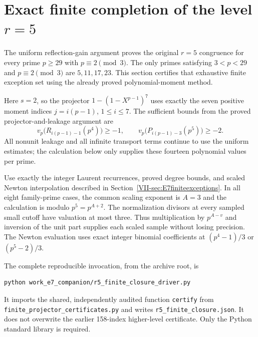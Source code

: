 \documentclass[11pt,letterpaper]{article}
\numberwithin{equation}{section}
\begin{document}
\section{Exact finite completion of the level \texorpdfstring{$r=5$}{r=5}}\label{loc-VII-13}
\label{VII-sec:E7r5finite}
The uniform reflection-gain argument proves the original $r=5$
congruence for every prime $p\ge29$ with $p\equiv2\pmod3$.
The only primes satisfying $3<p<29$ and $p\equiv2\pmod3$ are
$5,11,17,23$. This section certifies that exhaustive finite exception
set using the already proved polynomial-moment method.

Here $s=2$, so the projector $1-(1-X^{p-1})^7$ uses exactly the
seven positive moment indices $j=i(p-1)$, $1\le i\le7$.
The sufficient bounds from the proved projector-and-leakage argument are
\[
 v_p\bigl(R_{i(p-1)-1}(p^4)\bigr)\ge-1,
 \qquad
 v_p\bigl(P_{i(p-1)-3}(p^5)\bigr)\ge-2.
\]
All nonunit leakage and all infinite transport terms continue to use
the uniform estimates; the calculation below only supplies these
fourteen polynomial values per prime.

Use exactly the integer Laurent recurrences, proved degree bounds,
and scaled Newton interpolation described in
Section~\ref{VII-sec:E7finiteexceptions}. In all eight family-prime cases,
the common scaling exponent is $A=3$ and the calculation is modulo
$p^5=p^{A+2}$. The normalization divisors at every sampled small cutoff
have valuation at most three. Thus multiplication by $p^{A-v}$ and
inversion of the unit part supplies each scaled sample without losing
precision. The Newton evaluation uses exact integer binomial
coefficients at $(p^4-1)/3$ or $(p^5-2)/3$.

The complete reproducible invocation, from the archive root, is
\begin{verbatim}
python work_e7_companion/r5_finite_closure_driver.py
\end{verbatim}
It imports the shared, independently audited function
\texttt{certify} from \nolinkurl{finite_projector_certificates.py}
and writes \nolinkurl{r5_finite_closure.json}. It does not overwrite
the earlier 158-index higher-level certificate. Only the Python
standard library is required.
\end{document}
